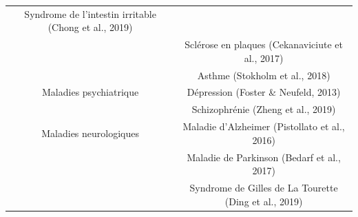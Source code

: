 \documentclass[12pt,a4paper]{reedthesis}
\theoremstyle{definition}
\theoremstyle{definition}
\theoremstyle{definition}
\theoremstyle{remark}
\begin{document}
\begin{longtable}[]{@{}cc@{}}
\begin{minipage}[t]{0.63\columnwidth}
Syndrome de l'intestin irritable (Chong et al., 2019)\strut
\end{minipage}\tabularnewline
\begin{minipage}[t]{0.31\columnwidth}\centering
\strut
\end{minipage} & \begin{minipage}[t]{0.63\columnwidth}\centering
Sclérose en plaques (Cekanaviciute et al., 2017)\strut
\end{minipage}\tabularnewline
\begin{minipage}[t]{0.31\columnwidth}\centering
\strut
\end{minipage} & \begin{minipage}[t]{0.63\columnwidth}\centering
Asthme (Stokholm et al., 2018)\strut
\end{minipage}\tabularnewline
\begin{minipage}[t]{0.31\columnwidth}\centering
Maladies psychiatrique\strut
\end{minipage} & \begin{minipage}[t]{0.63\columnwidth}\centering
Dépression (Foster \& Neufeld, 2013)\strut
\end{minipage}\tabularnewline
\begin{minipage}[t]{0.31\columnwidth}\centering
\strut
\end{minipage} & \begin{minipage}[t]{0.63\columnwidth}\centering
Schizophrénie (Zheng et al., 2019)\strut
\end{minipage}\tabularnewline
\begin{minipage}[t]{0.31\columnwidth}\centering
Maladies neurologiques\strut
\end{minipage} & \begin{minipage}[t]{0.63\columnwidth}\centering
Maladie d'Alzheimer (Pistollato et al., 2016)\strut
\end{minipage}\tabularnewline
\begin{minipage}[t]{0.31\columnwidth}\centering
\strut
\end{minipage} & \begin{minipage}[t]{0.63\columnwidth}\centering
Maladie de Parkinson (Bedarf et al., 2017)\strut
\end{minipage}\tabularnewline
\begin{minipage}[t]{0.31\columnwidth}\centering
\strut
\end{minipage} & \begin{minipage}[t]{0.63\columnwidth}\centering
Syndrome de Gilles de La Tourette (Ding et al., 2019)\strut

\end{minipage}
\end{longtable}
\end{document}
